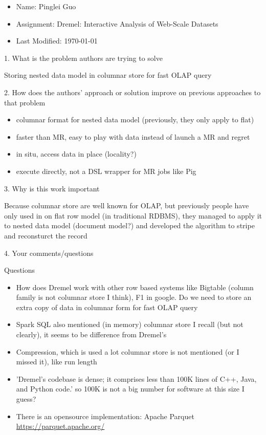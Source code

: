 \documentclass[12pt,a4paper,oneside]{article}
\begin{document}
\begin{itemize}
  \item Name: Pinglei Guo
  \item Assignment: Dremel: Interactive Analysis of Web-Scale Datasets
  \item Last Modified: \today
\end{itemize}

1. What is the problem authors are trying to solve

\medskip

Storing nested data model in columnar store for fast OLAP query

\bigskip

2. How does the authors’ approach or solution improve on previous approaches to that problem

\medskip

\begin{itemize}
  \item columnar format for nested data model (previously, they only apply to flat)
  \item faster than MR, easy to play with data instead of launch a MR and regret
  \item in situ, access data in place (locality?)
  \item execute directly, not a DSL wrapper for MR jobs like Pig
\end{itemize}

\bigskip

3. Why is this work important

\medskip

Because columnar store are well known for OLAP, but previously people have only used in on flat row model (in traditional RDBMS),
they managed to apply it to nested data model (document model?) and developed the algorithm to stripe and reconsturct the record

\bigskip

4. Your comments/questions

\medskip

Questions

\begin{itemize}
  \item How does Dremel work with other row based systems like Bigtable (column family is not columnar store I think), F1 in google.
  Do we need to store an extra copy of data in columnar form for fast OLAP query
  \item Spark SQL also mentioned (in memory) columnar store I recall (but not clearly), it seems to be difference from Dremel's
  \item Compression, which is used a lot columnar store is not mentioned (or I missed it), like run length
  \item 'Dremel’s codebase is dense; it comprises less than 100K lines of C++, Java, and Python code.' so 100K is not a big number for software at this size I guess?
  \item There is an opensource implementation: Apache Parquet \url{https://parquet.apache.org/}
\end{itemize}
\end{document}
